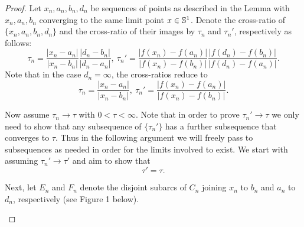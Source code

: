 \documentclass[11pt]{amsart}
\numberwithin{equation}{section}
\theoremstyle{plain}
\theoremstyle{step}
\newcommand{\abs}[1]{\lvert#1\rvert}
\newcommand{\Ss}{\Bbb{S}^1}
\begin{document}
\begin{proof}
    Let $x_n,a_n,b_n, d_n$ be sequences of points as described in the Lemma with $x_n,a_n,b_n$ converging to the same limit point $x\in \Ss$. 
    Denote the cross-ratio of $\{x_n,a_n,b_n,d_n\}$ and the cross-ratio of their images by $\tau_n$ and $\tau_n'$, respectively as follows:
    \[
    \tau_n=\frac{\abs{x_n-a_n}}{\abs{x_n-b_n}}\frac{\abs{d_n-b_n}}{\abs{d_n-a_n}}, \ 
\tau_n'=\frac{\abs{f(x_n)-f(a_n)}}{\abs{f(x_n)-f(b_n)}}\frac{\abs{f(d_n)-f(b_n)}}{\abs{f(d_n)-f(a_n)}}.
    \]
    Note that in the case $d_n=\infty$, the cross-ratios reduce to
     \[
    \tau_n=\frac{\abs{x_n-a_n}}{\abs{x_n-b_n}}, \ 
\tau_n'=\frac{\abs{f(x_n)-f(a_n)}}{\abs{f(x_n)-f(b_n)}}.
    \]

    Now assume $\tau_n\rightarrow\tau$ with $0<\tau<\infty$. Note that in order to prove $\tau_n'\rightarrow\tau$ we only need to show that any subsequence of $\{\tau_n'\}$ has a further subsequence that converges to $\tau$. Thus in the following argument we will freely pass to subsequences as needed in order for the limits involved to exist. We start with assuming $\tau_n'\rightarrow \tau'$ and aim to show that 
    \[\tau'=\tau.\]

    Next, let $E_n$ and $F_n$ denote the disjoint subarcs of $C_n$ joining $x_n$ to $ b_n$ and $a_n$ to $d_n$, respectively (see Figure 1 below). 
\begin{figure}[h]

\centering   

\begin{tikzpicture}[x=0.75pt,y=0.75pt,yscale=-.8,xscale=.8]



\end{tikzpicture}
\end{figure}
\end{proof}
\end{document}
